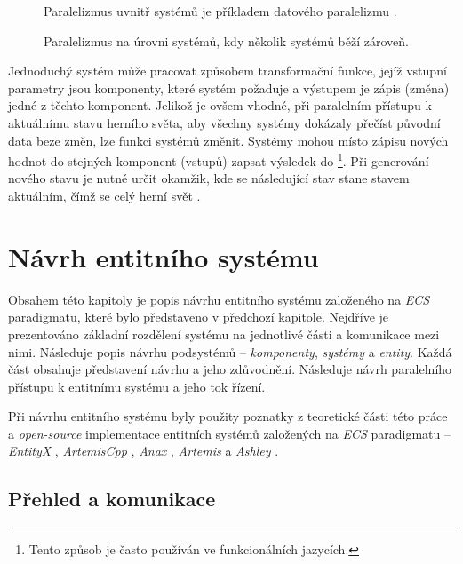 \begin{figure}
	\caption{Paralelizmus uvnitř systémů je příkladem datového paralelizmu \cite{KindsOfParallelism}.}
	\label{Fig:PARData}
\end{figure}

\begin{figure}
	\caption{Paralelizmus na úrovni systémů, kdy několik systémů běží zároveň.}
	\label{Fig:PARSystem}
\end{figure}

Jednoduchý systém může pracovat způsobem transformační funkce, jejíž vstupní parametry jsou komponenty, které systém požaduje a výstupem je zápis (změna) jedné z těchto komponent. Jelikož je ovšem vhodné, při paralelním přístupu k aktuálnímu stavu herního světa, aby všechny systémy dokázaly přečíst původní data beze změn, lze funkci systémů změnit. Systémy mohou místo zápisu nových hodnot do stejných komponent (vstupů) zapsat výsledek do  \cite{FrontierThreads} \footnote{Tento způsob je často používán ve funkcionálních jazycích.}. Při generování nového stavu je nutné určit okamžik, kde se následující stav stane stavem aktuálním, čímž se celý herní svět .

\chapter{Návrh entitního systému}

Obsahem této kapitoly je popis návrhu entitního systému založeného na \emph{ECS} paradigmatu, které bylo představeno v předchozí kapitole. Nejdříve je prezentováno základní rozdělení systému na jednotlivé části a komunikace mezi nimi. Následuje popis návrhu podsystémů -- \emph{komponenty}, \emph{systémy} a \emph{entity}. Každá část obsahuje představení návrhu a jeho zdůvodnění. Následuje návrh paralelního přístupu k entitnímu systému a jeho tok řízení.

Při návrhu entitního systému byly použity poznatky z teoretické části této práce a \emph{open-source} implementace entitních systémů založených na \emph{ECS} paradigmatu -- \emph{EntityX} \cite{EntityX}, \emph{ArtemisCpp} \cite{ArtemisCpp}, \emph{Anax} \cite{Anax}, \emph{Artemis} \cite{ArtemisJava} a \emph{Ashley} \cite{Ashley}.

\section{Přehled a komunikace}

